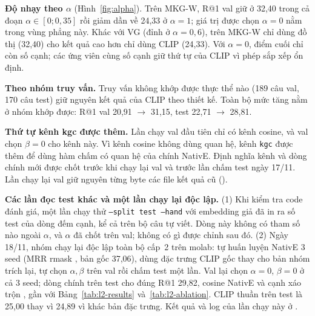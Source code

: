 \textbf{Độ nhạy theo $\alpha$} (Hình~\ref{fig:alpha}). Trên MKG-W, R@1 val giữ ở 32,40 trong cả đoạn $\alpha \in [0; 0{,}35]$
rồi giảm dần về 24,33 ở $\alpha = 1$; giá trị được chọn $\alpha = 0$ nằm trong vùng phẳng này. Khác với VG (đỉnh ở
$\alpha = 0{,}6$), trên MKG-W chỉ dùng đồ thị (32,40) cho kết quả cao hơn chỉ dùng CLIP (24,33). Với $\alpha = 0$, điểm cuối
chỉ còn số cạnh; các ứng viên cùng số cạnh giữ thứ tự của CLIP vì phép sắp xếp ổn định.

\textbf{Theo nhóm truy vấn.} Truy vấn không khớp được thực thể nào (189 câu val, 170 câu test) giữ nguyên kết quả của CLIP
theo thiết kế. Toàn bộ mức tăng nằm ở nhóm khớp được: R@1 val 20,91 $\to$ 31,15, test 22,71 $\to$ 28,81.

\textbf{Thứ tự kênh kgc được thêm.} Lần chạy val đầu tiên chỉ có kênh cosine, và val chọn $\beta = 0$ cho kênh này. Vì kênh
cosine không dùng quan hệ, kênh \texttt{kgc} được thêm để dùng hàm chấm có quan hệ của chính NativE. Định nghĩa kênh và dòng
chính mới được chốt trước khi chạy lại val và trước lần chấm test ngày 17/11. Lần chạy lại val giữ nguyên từng byte các file
kết quả cũ ().

\textbf{Các lần đọc test khác và một lần chạy lại độc lập.} (1) Khi kiểm tra code đánh giá, một lần chạy thử
\texttt{--split test --hand} với embedding giả đã in ra số test của dòng đếm cạnh, kể cả trên bộ câu tự viết. Dòng này không
có tham số nào ngoài $\alpha$, và $\alpha$ đã chốt trên val; không có gì được chỉnh sau đó. (2) Ngày 18/11, nhóm chạy lại độc
lập toàn bộ cấp~2 trên molab: tự huấn luyện NativE 3 seed (MRR rmask , bản gốc 37,06), dùng đặc trưng
CLIP gốc thay cho bản nhóm trích lại, tự chọn $\alpha,\beta$ trên val rồi chấm test một lần. Val lại chọn $\alpha = 0$,
$\beta = 0$ ở cả 3 seed; dòng chính trên test cho đúng R@1 29,82, cosine NativE  và cạnh xáo trộn
, gần với Bảng~\ref{tab:l2-results} và~\ref{tab:l2-ablation}. CLIP thuần trên test là 25,00 thay vì 24,89
vì khác bản đặc trưng. Kết quả và log của lần chạy này ở .


